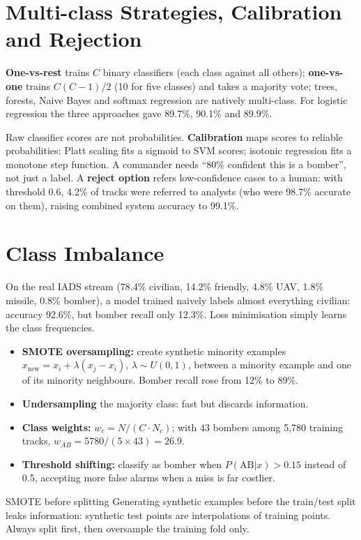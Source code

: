\documentclass[11pt]{article}
\begin{document}
\section{Multi-class Strategies, Calibration and Rejection}
\textbf{One-vs-rest} trains $C$ binary classifiers (each class against all others); \textbf{one-vs-one} trains $C(C-1)/2$ (10 for five classes) and takes a majority vote; trees, forests, Naive Bayes and softmax regression are natively multi-class. For logistic regression the three approaches gave 89.7\%, 90.1\% and 89.9\%.

Raw classifier scores are not probabilities. \textbf{Calibration} maps scores to reliable probabilities: Platt scaling fits a sigmoid to SVM scores; isotonic regression fits a monotone step function. A commander needs ``80\% confident this is a bomber'', not just a label. A \textbf{reject option} refers low-confidence cases to a human: with threshold 0.6, 4.2\% of tracks were referred to analysts (who were 98.7\% accurate on them), raising combined system accuracy to 99.1\%.

\section{Class Imbalance}
On the real IADS stream (78.4\% civilian, 14.2\% friendly, 4.8\% UAV, 1.8\% missile, 0.8\% bomber), a model trained naively labels almost everything civilian: accuracy 92.6\%, but bomber recall only 12.3\%. Loss minimisation simply learns the class frequencies.
\begin{itemize}
\item \textbf{SMOTE oversampling:} create synthetic minority examples $x_{\text{new}}=x_i+\lambda(x_j-x_i)$, $\lambda\sim U(0,1)$, between a minority example and one of its minority neighbours. Bomber recall rose from 12\% to 89\%.
\item \textbf{Undersampling} the majority class: fast but discards information.
\item \textbf{Class weights:} $w_c=N/(C\cdot N_c)$; with 43 bombers among 5,780 training tracks, $w_{AB}=5780/(5\times43)=26.9$.
\item \textbf{Threshold shifting:} classify as bomber when $P(\text{AB}|x)>0.15$ instead of 0.5, accepting more false alarms when a miss is far costlier.
\end{itemize}
\begin{pitfall}{SMOTE before splitting}
Generating synthetic examples before the train/test split leaks information: synthetic test points are interpolations of training points. Always split first, then oversample the training fold only.
\end{pitfall}
\end{document}
